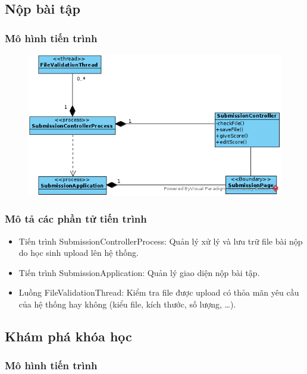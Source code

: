 \documentclass[./../main_file.tex]{subfiles}
\begin{document}
\subsection{Nộp bài tập}

\subsubsection{Mô hình tiến trình}

\begin{figure}[H]
	\centering
	\includegraphics[width=\linewidth]{./images/pv_submit_assignment.png}
\end{figure}

\subsubsection{Mô tả các phần tử tiến trình}

\begin{itemize}
	\item Tiến trình SubmissionControllerProcess: Quản lý xử lý và lưu trữ file bài nộp do học sinh upload lên hệ thống.
	\item Tiến trình SubmissionApplication: Quản lý giao diện nộp bài tập.
	\item Luồng FileValidationThread: Kiểm tra file được upload có thỏa mãn yêu cầu của hệ thống hay không (kiểu file, kích thước, số lượng, …).
\end{itemize}

\subsection{Khám phá khóa học}

\subsubsection{Mô hình tiến trình}
\end{document}
